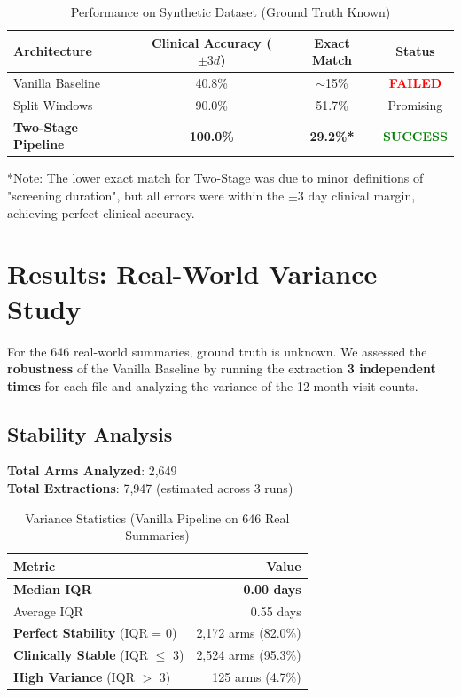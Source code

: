 \documentclass[11pt, a4paper]{article}
\begin{document}
\begin{table}[H]
    \centering
    \caption{Performance on Synthetic Dataset (Ground Truth Known)}
    \begin{tabular}{lccc}
        \toprule
        \textbf{Architecture} & \textbf{Clinical Accuracy ($\pm 3d$)} & \textbf{Exact Match} & \textbf{Status} \\
        \midrule
        Vanilla Baseline & 40.8\% & $\sim$15\% & \textcolor{red}{\textbf{FAILED}} \\
        Split Windows & 90.0\% & 51.7\% & Promising \\
        \textbf{Two-Stage Pipeline} & \textbf{100.0\%} & \textbf{29.2\%*} & \textcolor{green}{\textbf{SUCCESS}} \\
        \bottomrule
    \end{tabular}
    \vspace{0.2cm}
    
    \small{*Note: The lower exact match for Two-Stage was due to minor definitions of "screening duration", but all errors were within the $\pm 3$ day clinical margin, achieving perfect clinical accuracy.}
\end{table}

\section{Results: Real-World Variance Study}
For the 646 real-world summaries, ground truth is unknown. We assessed the \textbf{robustness} of the Vanilla Baseline by running the extraction \textbf{3 independent times} for each file and analyzing the variance of the 12-month visit counts.

\subsection{Stability Analysis}
\textbf{Total Arms Analyzed}: 2,649 \\
\textbf{Total Extractions}: 7,947 (estimated across 3 runs)

\begin{table}[H]
    \centering
    \caption{Variance Statistics (Vanilla Pipeline on 646 Real Summaries)}
    \begin{tabular}{lr}
        \toprule
        \textbf{Metric} & \textbf{Value} \\
        \midrule
        \textbf{Median IQR} & \textbf{0.00 days} \\
        Average IQR & 0.55 days \\
        \midrule
        \textbf{Perfect Stability} (IQR = 0) & 2,172 arms (82.0\%) \\
        \textbf{Clinically Stable} (IQR $\le$ 3) & 2,524 arms (95.3\%) \\
        \textbf{High Variance} (IQR $>$ 3) & 125 arms (4.7\%) \\
        \bottomrule
    \end{tabular}
\end{table}
\end{document}
